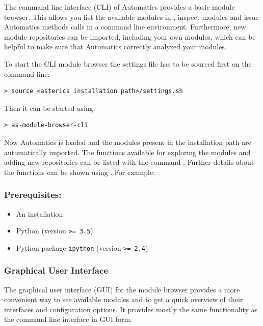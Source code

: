 The command line interface (CLI) of Automatics provides a basic \asterics module browser.
This allows you list the available modules in \asterics, inspect modules and issue Automatics methods calls in a command line environment.
Furthermore, new module repositories can be imported, including your own modules, which can be helpful to make sure that Automatics correctly analyzed your modules.


To start the CLI module browser the \asterics settings file has to be sourced first on the command line:
\begin{lstlisting}[style=shell]
 > source <asterics installation path>/settings.sh
\end{lstlisting}

Then it can be started using:
\begin{lstlisting}[style=shell]
 > as-module-browser-cli
\end{lstlisting}

Now Automatics is loaded and the modules present in the \asterics installation path are automatically imported.
The functions available for exploring the modules and adding new repositories can be listed with the command .
Further details about the functions can be shown using .
For example:

\subsubsection*{Prerequisites:}

\begin{itemize}
\item An \asterics installation
\item Python (version \texttt{>= 3.5}) 
\item Python package \texttt{ipython} (version \texttt{>= 2.4})
\end{itemize}

\subsubsection{Graphical User Interface}
\label{sec:06-02-gui}


The graphical user interface (GUI) for the \asterics module browser provides a more convenient way to see available modules and to get a quick overview of their interfaces and configuration options.
It provides mostly the same functionality as the command line interface in GUI form.

